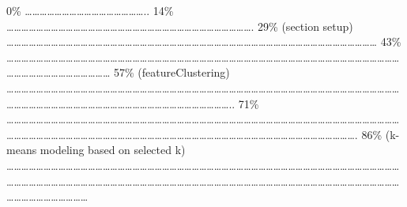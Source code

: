\documentclass[
]{article}
\begin{document}
\textbar{} \textbar{} \textbar{} 0\% \textbar{}
\textbar\ldots\ldots\ldots\ldots\ldots\ldots\ldots\ldots\ldots\ldots\ldots\ldots\ldots\ldots\ldots\ldots..
\textbar{} 14\% \textbar{}
\textbar\ldots\ldots\ldots\ldots\ldots\ldots\ldots\ldots\ldots\ldots\ldots\ldots\ldots\ldots\ldots\ldots\ldots\ldots\ldots\ldots\ldots\ldots\ldots\ldots\ldots\ldots\ldots\ldots\ldots\ldots\ldots\ldots\ldots.
\textbar{} 29\% (section setup) \textbar{}
\textbar\ldots\ldots\ldots\ldots\ldots\ldots\ldots\ldots\ldots\ldots\ldots\ldots\ldots\ldots\ldots\ldots\ldots\ldots\ldots\ldots\ldots\ldots\ldots\ldots\ldots\ldots\ldots\ldots\ldots\ldots\ldots\ldots\ldots\ldots\ldots\ldots\ldots\ldots\ldots\ldots\ldots\ldots\ldots\ldots\ldots\ldots\ldots\ldots\ldots\ldots{}
\textbar{} 43\% \textbar{}
\textbar\ldots\ldots\ldots\ldots\ldots\ldots\ldots\ldots\ldots\ldots\ldots\ldots\ldots\ldots\ldots\ldots\ldots\ldots\ldots\ldots\ldots\ldots\ldots\ldots\ldots\ldots\ldots\ldots\ldots\ldots\ldots\ldots\ldots\ldots\ldots\ldots\ldots\ldots\ldots\ldots\ldots\ldots\ldots\ldots\ldots\ldots\ldots\ldots\ldots\ldots\ldots\ldots\ldots\ldots\ldots\ldots\ldots\ldots\ldots\ldots\ldots\ldots\ldots\ldots\ldots\ldots\ldots{}
\textbar{} 57\% (featureClustering) \textbar{}
\textbar\ldots\ldots\ldots\ldots\ldots\ldots\ldots\ldots\ldots\ldots\ldots\ldots\ldots\ldots\ldots\ldots\ldots\ldots\ldots\ldots\ldots\ldots\ldots\ldots\ldots\ldots\ldots\ldots\ldots\ldots\ldots\ldots\ldots\ldots\ldots\ldots\ldots\ldots\ldots\ldots\ldots\ldots\ldots\ldots\ldots\ldots\ldots\ldots\ldots\ldots\ldots\ldots\ldots\ldots\ldots\ldots\ldots\ldots\ldots\ldots\ldots\ldots\ldots\ldots\ldots\ldots\ldots\ldots\ldots\ldots\ldots\ldots\ldots\ldots\ldots\ldots\ldots\ldots\ldots\ldots\ldots\ldots\ldots..
\textbar{} 71\% \textbar{}
\textbar\ldots\ldots\ldots\ldots\ldots\ldots\ldots\ldots\ldots\ldots\ldots\ldots\ldots\ldots\ldots\ldots\ldots\ldots\ldots\ldots\ldots\ldots\ldots\ldots\ldots\ldots\ldots\ldots\ldots\ldots\ldots\ldots\ldots\ldots\ldots\ldots\ldots\ldots\ldots\ldots\ldots\ldots\ldots\ldots\ldots\ldots\ldots\ldots\ldots\ldots\ldots\ldots\ldots\ldots\ldots\ldots\ldots\ldots\ldots\ldots\ldots\ldots\ldots\ldots\ldots\ldots\ldots\ldots\ldots\ldots\ldots\ldots\ldots\ldots\ldots\ldots\ldots\ldots\ldots\ldots\ldots\ldots\ldots\ldots\ldots\ldots\ldots\ldots\ldots\ldots\ldots\ldots\ldots\ldots\ldots\ldots\ldots\ldots\ldots\ldots.
\textbar{} 86\% (k-means modeling based on selected k) \textbar{}
\textbar\ldots\ldots\ldots\ldots\ldots\ldots\ldots\ldots\ldots\ldots\ldots\ldots\ldots\ldots\ldots\ldots\ldots\ldots\ldots\ldots\ldots\ldots\ldots\ldots\ldots\ldots\ldots\ldots\ldots\ldots\ldots\ldots\ldots\ldots\ldots\ldots\ldots\ldots\ldots\ldots\ldots\ldots\ldots\ldots\ldots\ldots\ldots\ldots\ldots\ldots\ldots\ldots\ldots\ldots\ldots\ldots\ldots\ldots\ldots\ldots\ldots\ldots\ldots\ldots\ldots\ldots\ldots\ldots\ldots\ldots\ldots\ldots\ldots\ldots\ldots\ldots\ldots\ldots\ldots\ldots\ldots\ldots\ldots\ldots\ldots\ldots\ldots\ldots\ldots\ldots\ldots\ldots\ldots\ldots\ldots\ldots\ldots\ldots\ldots\ldots\ldots\ldots\ldots\ldots\ldots\ldots\ldots\ldots\ldots\ldots\ldots\ldots\ldots\ldots\ldots\ldots\ldots\textbar{}
\end{document}
